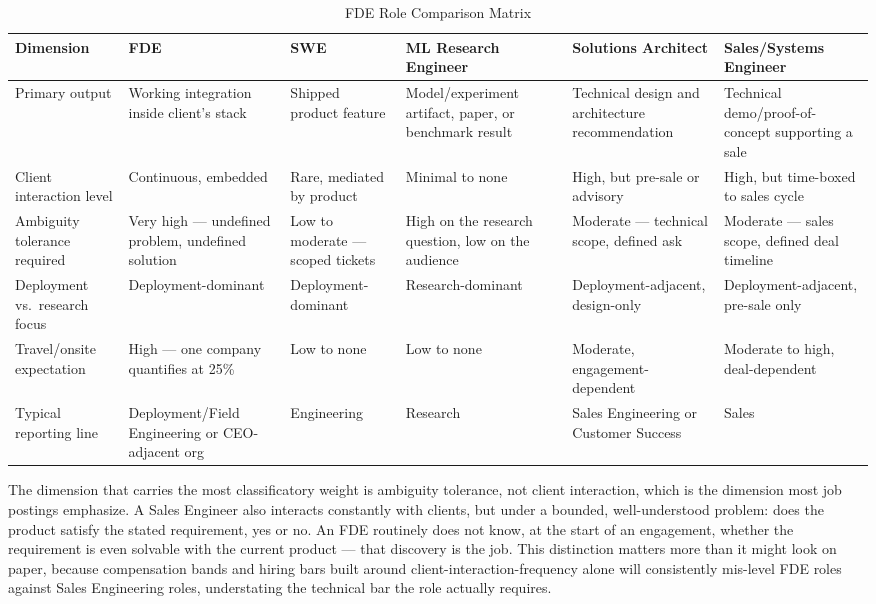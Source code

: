 \documentclass[journal]{IEEEtran}
\begin{document}
\begin{table}[t]
\caption{FDE Role Comparison Matrix}
\label{tab:matrix}
\centering
\footnotesize
\begin{tabular}{p{1.9cm}p{2.6cm}p{2.3cm}p{2.6cm}p{2.6cm}p{2.6cm}}
\toprule
\rowcolor{darkblue!15}
\textbf{Dimension} & \textbf{FDE} & \textbf{SWE} & \textbf{ML Research Engineer} & \textbf{Solutions Architect} & \textbf{Sales/Systems Engineer} \\
\midrule
\rowcolor{steelblue!8}
Primary output & Working integration inside client's stack & Shipped product feature & Model/experiment artifact, paper, or benchmark result & Technical design and architecture recommendation & Technical demo/proof-of-concept supporting a sale \\
\rowcolor{tealcolor!8}
Client interaction level & Continuous, embedded & Rare, mediated by product & Minimal to none & High, but pre-sale or advisory & High, but time-boxed to sales cycle \\
\rowcolor{ambercolor!10}
Ambiguity tolerance required & Very high --- undefined problem, undefined solution & Low to moderate --- scoped tickets & High on the research question, low on the audience & Moderate --- technical scope, defined ask & Moderate --- sales scope, defined deal timeline \\
\rowcolor{slateblue!8}
Deployment vs.\ research focus & Deployment-dominant & Deployment-dominant & Research-dominant & Deployment-adjacent, design-only & Deployment-adjacent, pre-sale only \\
\rowcolor{midgreen!8}
Travel/onsite expectation & High --- one company quantifies at 25\% \cite{anthropic2026fde} & Low to none & Low to none & Moderate, engagement-dependent & Moderate to high, deal-dependent \\
\rowcolor{deepred!6}
Typical reporting line & Deployment/Field Engineering or CEO-adjacent org & Engineering & Research & Sales Engineering or Customer Success & Sales \\
\bottomrule
\end{tabular}
\end{table}

The dimension that carries the most classificatory weight is ambiguity tolerance, not client interaction, which is the dimension most job postings emphasize. A Sales Engineer also interacts constantly with clients, but under a bounded, well-understood problem: does the product satisfy the stated requirement, yes or no. An FDE routinely does not know, at the start of an engagement, whether the requirement is even solvable with the current product --- that discovery is the job. This distinction matters more than it might look on paper, because compensation bands and hiring bars built around client-interaction-frequency alone will consistently mis-level FDE roles against Sales Engineering roles, understating the technical bar the role actually requires.
\end{document}

